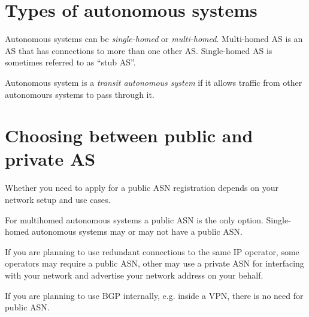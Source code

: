 \section{Types of autonomous systems}

Autonomous systems can be \emph{single-homed} or \emph{multi-homed}. Multi-homed AS is an AS that has connections to more than
one other AS. Single-homed AS is sometimes referred to as ``stub AS''.

Autonomous system is a \emph{transit autonomous system} if it allows traffic from other autonomours systems to pass through it.

\section{Choosing between public and private AS}

Whether you need to apply for a public ASN registration depends on your network setup and use cases.

For multihomed autonomous systems a public ASN is the only option. Single-homed autonomous systems may or may not
have a public ASN.

If you are planning to use redundant connections to the same IP operator, some operators may require a public ASN,
other may use a private ASN for interfacing with your network and advertise your network address on your behalf.

If you are planning to use BGP internally, e.g. inside a VPN, there is no need for public ASN.
